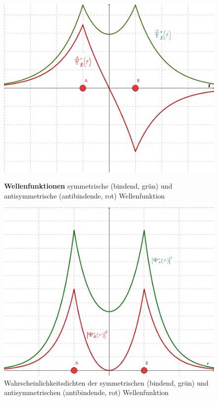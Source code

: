 \label{q:42}
\begin{figure}[H]
    \centering
   \begin{minipage}[b]{.4\linewidth} %
      \includegraphics[width=\linewidth]{resources/16-03-2012/sym_und_antisymm_Wellenfunktion.jpeg}
      \caption{\textbf{Wellenfunktionen} symmetrische (bindend, grün) und antisymmetrische (antibindende, rot) Wellenfunktion}
   \end{minipage}
   \hspace{.1\linewidth}%
   \begin{minipage}[b]{.4\linewidth} %
      \includegraphics[width=\linewidth]{resources/16-03-2012/Wahrscheinlichkeitsdichten.jpeg}
      \caption{Wahrscheinlichkeitsdichten der symmetrischen (bindend, grün) und antisymmetrischen (antibindende, rot) Wellenfunktion}
   \end{minipage}
\end{figure}

